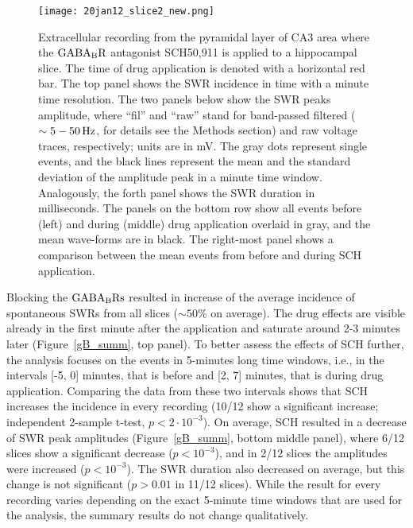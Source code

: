     \begin{figure}
      \center
      \texttt{[image: 20jan12\_slice2\_new.png]}
      \caption{ 
        Extracellular recording from the pyramidal layer of CA3 area where the
        $\rm GABA_B R$ antagonist SCH50,911 is applied to a hippocampal slice.
        The time of drug application is denoted with a horizontal red bar. The
        top panel shows the SWR incidence in time with a minute time resolution.
        The two panels below show the SWR peaks amplitude, where ``fil'' and ``raw''
        stand for band-passed filtered ($\sim 5-50\, \rm Hz$, for details see
        the Methods section) and raw voltage traces, respectively; units are in
        mV. The gray dots represent single events, and the black lines
        represent the mean and the standard deviation of the amplitude peak in
        a minute time window. Analogously, the forth panel shows the SWR
        duration in milliseconds. The panels on the bottom row show all events
        before (left) and during (middle) drug application overlaid in gray,
        and the mean wave-forms are in black. The right-most panel shows a
        comparison between the mean events from before and during SCH
        application.
              }
    \label{fig:gB_example}
    \end{figure}

    Blocking the $\rm GABA_B Rs$ resulted in increase of the average incidence
    of spontaneous SWRs from all slices ($\sim 50\%$ on average). The drug
    effects are visible already in the first minute after the application and
    saturate around 2-3 minutes later (Figure~\ref{gB_summ}, top panel). To
    better assess the effects of SCH further, the analysis focuses on the
    events in 5-minutes long time windows, i.e., in the intervals [-5, 0]
    minutes, that is before and [2, 7] minutes, that is during drug
    application. Comparing the data from these two intervals shows that SCH
    increases the incidence in every recording (10/12 show a significant
    increase; independent 2-sample t-test, $p<2 \cdot 10^{-3}$). On average,
    SCH resulted in a decrease of SWR peak amplitudes (Figure~\ref{gB_summ},
    bottom middle panel), where 6/12 slices show a significant decrease
    ($p<10^{-3}$), and in 2/12 slices the amplitudes were increased
    ($p<10^{-3}$). The SWR duration also decreased on average, but this change
    is not significant ($p>0.01$ in 11/12 slices). While the result for every
    recording varies depending on the exact 5-minute time windows that are used
    for the analysis, the summary results do not change qualitatively.
    
